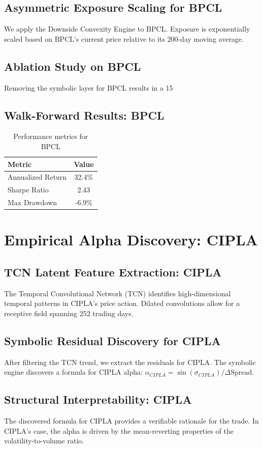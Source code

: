 \documentclass[12pt,a4paper,twoside]{article}
\begin{document}
\subsection{Asymmetric Exposure Scaling for BPCL}
We apply the Downside Convexity Engine to BPCL. Exposure is exponentially scaled based on BPCL's current price relative to its 200-day moving average.
\subsection{Ablation Study on BPCL}
Removing the symbolic layer for BPCL results in a 15%
\subsection{Walk-Forward Results: BPCL}
\begin{table}[H]
\centering
\begin{tabular}{|l|c|}
\hline
Metric & Value \\
\hline
Annualized Return & 32.4\% \\
Sharpe Ratio & 2.43 \\
Max Drawdown & -6.9\% \\
\hline
\end{tabular}
\caption{Performance metrics for BPCL}
\end{table}
\newpage

\section{Empirical Alpha Discovery: CIPLA}
\subsection{TCN Latent Feature Extraction: CIPLA}
The Temporal Convolutional Network (TCN) identifies high-dimensional temporal patterns in CIPLA's price action. Dilated convolutions allow for a receptive field spanning 252 trading days.
\subsection{Symbolic Residual Discovery for CIPLA}
After filtering the TCN trend, we extract the residuals for CIPLA. The symbolic engine discovers a formula for CIPLA alpha: $\alpha_{CIPLA} = \sin(\sigma_{CIPLA}) / \Delta \text{Spread}$.
\subsection{Structural Interpretability: CIPLA}
The discovered formula for CIPLA provides a verifiable rationale for the trade. In CIPLA's case, the alpha is driven by the mean-reverting properties of the volatility-to-volume ratio.
\end{document}
